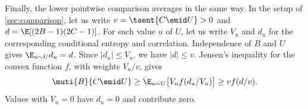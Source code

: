 Finally, the lower pointwise comparison averages in the same way.
In the setup of \autoref{sec:comparison}, let us write
$v=\tsent{C\emid U}>0$ and
$d=\E[(2B-1)(2C-1)]$.
For each value $u$ of $U$, let us write $V_u$ and $d_u$ for the
corresponding conditional entropy and correlation.
Independence of $B$ and $U$ gives $\E_{u\sim U}d_u=d$.
Since $|d_u|\le V_u$, we have $|d|\le v$.
Jensen's inequality for the convex function $f$, with weights
$V_u/v$, gives
\begin{equation*}
  \muti{B}{C\emid U}
  \ge\E_{u\sim U}\bigl[V_u f(d_u/V_u)\bigr]
  \ge v f(d/v).
\end{equation*}
Values with $V_u=0$ have $d_u=0$ and contribute zero.
